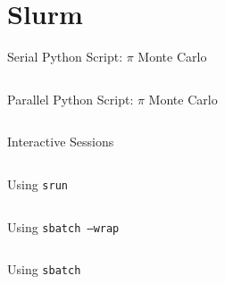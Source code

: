 \section{Slurm}

\begin{frame}{Serial Python Script: \(\pi\) Monte Carlo}
\begin{listing}[H]
\inputminted{python}{examples/slurm_tutorial/pi_monte_carlo.py}
\caption{Serial algorithm to estimate the value of \(\pi\).}
\end{listing}
\end{frame}

\begin{frame}{Parallel Python Script: \(\pi\) Monte Carlo}
\begin{listing}[H]
\inputminted[fontsize=\tiny]{python}{examples/slurm_tutorial/pi_monte_carlo_shared.py}
\caption{Parallel algorithm to estimate the value of \(\pi\).}
\end{listing}
\end{frame}

\begin{frame}{Interactive Sessions}
\begin{listing}[H]
\inputminted{sh}{examples/slurm_tutorial/01_interactive_session}
\caption{Using \texttt{srun} to log into a compute node to run commands interactively.}
\end{listing}
\end{frame}

\begin{frame}{Using \texttt{srun}}
\begin{listing}[H]
\inputminted{sh}{examples/slurm_tutorial/02_srun}
\caption{Using \texttt{srun} to run commands directly on a compute node.}
\end{listing}
\end{frame}

\begin{frame}{Using \texttt{sbatch --wrap}}
\begin{listing}[H]
\inputminted{sh}{examples/slurm_tutorial/03_sbatch_wrap}
\caption{Using \texttt{sbatch --wrap} wrap a commands in an \texttt{sbatch} script that is then submitted to the queue can run non-interactively.}
\end{listing}
\end{frame}

\begin{frame}{Using \texttt{sbatch}}
\begin{listing}[H]
\inputminted{sh}{examples/slurm_tutorial/04_sbatch_htc.sbatch}
\caption{Using \texttt{sbatch} run serial computations via an \texttt{sbatch} script.}
\end{listing}
\end{frame}

